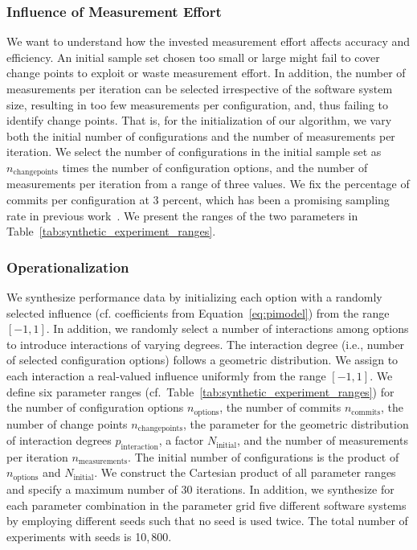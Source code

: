 \documentclass[sigconf]{acmart}
\begin{document}
	\subsubsection{Influence of Measurement Effort}
	We want to understand how the invested measurement effort affects accuracy and efficiency. An initial sample set chosen too small or large might fail to cover change points to exploit or waste measurement effort. In addition, the number of measurements per iteration can be selected irrespective of the software system size, resulting in too few measurements per configuration, and, thus failing to identify change points. That is, for the initialization of our algorithm, we vary both the initial number of configurations and the number of measurements per iteration. We select the number of configurations in the initial sample set as $n_\text{changepoints}$ times the number of configuration options, and the number of measurements per iteration from a range of three values. We fix the percentage of commits per configuration at 3 percent, which has been a promising sampling rate in previous work~\cite{muhlbauer_accurate_2019}. 
	We present the ranges of the two parameters in Table~\ref{tab:synthetic_experiment_ranges}.
	
	\subsubsection{Operationalization}
	We {\color{red}synthesize performance data by initializing each option with a randomly selected influence (cf. coefficients from Equation~\ref{eq:pimodel}) from the range $\left[-1,1 \right]$}. In addition, we randomly select a number of interactions among options to introduce interactions of varying degrees. The interaction degree (i.e., number of selected configuration options) follows a geometric distribution. We assign to each interaction a real-valued influence uniformly from the range $[-1, 1]$. We define six parameter ranges (cf.~Table~\ref{tab:synthetic_experiment_ranges}) for the number of configuration options $n_\text{options}$, the number of commits $n_\text{commits}$, the number of change points $n_\text{changepoints}$, the parameter for the geometric distribution of interaction degrees $p_\text{interaction}$, a factor $N_\text{initial}$, and the number of measurements per iteration $n_\text{measurements}$. The initial number of configurations is the product of $n_\text{options}$ and $N_\text{initial}$. We construct the Cartesian product of all parameter ranges and specify a maximum number of 30 iterations. In addition, we synthesize for each parameter combination in the parameter grid five different software systems by employing different seeds such that no seed is used twice. The total number of experiments with seeds is 10,\,800.%
	
\end{document}
